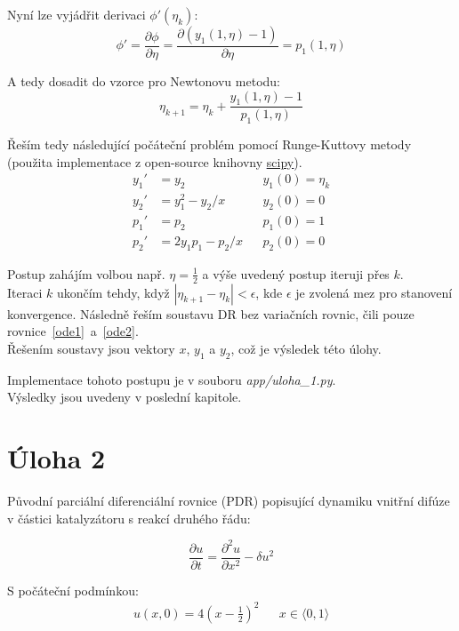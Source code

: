 \documentclass[a4paper,12pt]{article}
\begin{document}
Nyní lze vyjádřit derivaci $\phi'(\eta_k)$:
\begin{equation}
	\phi' = \frac{\partial \phi}{\partial \eta} = \frac{\partial (y_1(1, \eta) - 1)}{\partial \eta} = p_1(1, \eta)
\end{equation}

A tedy dosadit do vzorce pro Newtonovu metodu:
\begin{equation}
	\eta_{k+1} = \eta_{k} + \frac{y_1(1, \eta) - 1}{p_1(1, \eta)}
\end{equation}

Řeším tedy následující počáteční problém pomocí Runge-Kuttovy metody (použita implementace z open-source knihovny \textcolor{blue}{\underline{\href{https://scipy.org/}{scipy}}}).
\begin{align}
\label{ode1}
	y_1' &= y_2 &&
	y_1(0) = \eta_k
	\\
\label{ode2}
	y_2' &= y_1^2 - y_2 / x &&
	y_2(0) = 0
	\\
	p_1' &= p_2 &&
	p_1(0) = 1
	\\
	p_2' &= 2 y_1 p_1 - p_2 / x &&
	p_2(0) = 0
\end{align}

Postup zahájím volbou např. $\eta = \tfrac{1}{2}$ a výše uvedený postup iteruji přes $k$. \\
Iteraci $k$ ukončím tehdy, když $|\eta_{k+1} - \eta_{k}| < \epsilon$, kde $\epsilon$ je zvolená mez pro stanovení konvergence.
Následně řeším soustavu DR bez variačních rovnic, čili pouze rovnice~\ref{ode1}~a~\ref{ode2}. \\
Řešením soustavy jsou vektory $x$, $y_1$ a $y_2$, což je výsledek této úlohy.

Implementace tohoto postupu je v souboru \textit{app/uloha\_1.py}. \\
Výsledky jsou uvedeny v poslední kapitole.



\newpage
\section*{Úloha 2}
Původní parciální diferenciální rovnice (PDR) popisující dynamiku vnitřní difúze v částici katalyzátoru s reakcí druhého řádu:

\begin{equation}
	\frac{\partial u}{\partial t} = \frac{\partial^2 u}{\partial x^2} - \delta u^2
\end{equation}

S počáteční podmínkou:
\begin{align}
	u(x,0) = 4 (x - \tfrac{1}{2})^2 && x \in \langle0, 1\rangle
\end{align}
\end{document}

